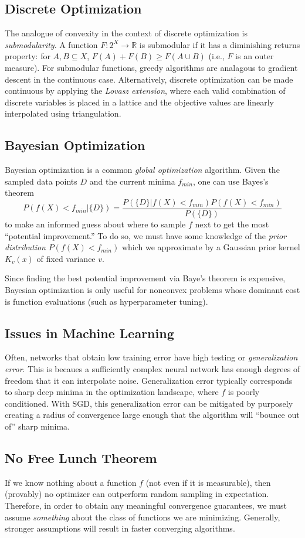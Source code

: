 \documentclass[12pt]{article}
\begin{document}
\subsection*{Discrete Optimization}

The analogue of convexity in the context of discrete optimization is
{\it submodularity}.
A function $F : 2^X \rightarrow \mathbb{R}$ is submodular if it has a 
diminishing returns property: for $A,B \subseteq X$, 
$F(A) + F(B) \geq F(A \cup B)$ (i.e., $F$ is an outer measure).
For submodular functions, greedy algorithms are analagous to gradient descent 
in the continuous case.
Alternatively, discrete optimization can be made continuous by applying the 
{\it Lovasz extension}, where each valid combination of discrete variables is 
placed in a lattice and the objective values are linearly interpolated using 
triangulation.

\subsection*{Bayesian Optimization}

Bayesian optimization is a common {\it global optimization} algorithm.
Given the sampled data points $D$ and the current minima 
$f_{min}$, one can use Bayes's theorem
$$
P(f(X) < f_{min} | \{D\}) = \frac{P(\{D\} | f(X) < f_{min})P(f(X) < f_{min})}
{P(\{D\})}
$$ 
to make an informed guess about where to
sample $f$ next to get the most ``potential improvement.''
To do so, we must have some knowledge of the {\it prior distribution} 
$P(f(X) < f_{min})$ which we approximate by a Gaussian prior kernel $K_v(x)$ 
of fixed variance $v$.

Since finding the best potential improvement via Baye's theorem is expensive, 
Bayesian optimization is only useful for nonconvex problems whose dominant 
cost is function evaluations (such as hyperparameter tuning).

\subsection*{Issues in Machine Learning}

Often, networks that obtain low training error have high testing or 
{\it generalization error}.
This is becaues a sufficiently complex neural network has enough degrees of
freedom that it can interpolate noise.
Generalization error typically corresponds to sharp deep minima in the
optimization landscape, where $f$ is poorly conditioned.
With SGD, this generalization error can be mitigated by purposely creating
a radius of convergence large enough that the algorithm will ``bounce out of''
sharp minima.

\subsection*{No Free Lunch Theorem}

If we know nothing about a function $f$ (not even if it is measurable),
then (provably) no optimizer can outperform random sampling in expectation.
Therefore, in order to obtain any meaningful convergence guarantees, we
must assume {\it something} about the class of functions we are minimizing.
Generally, stronger assumptions will result in faster converging algorithms.
\end{document}
